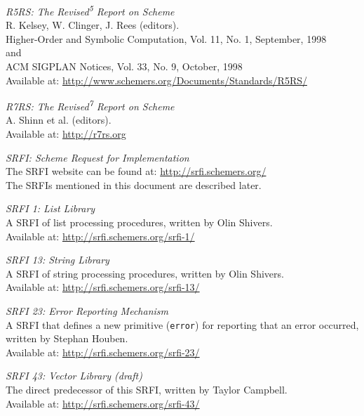 \begin{description}
\tightlist
\item[\href{}{R5RS}]
\emph{R5RS: The Revised\textsuperscript{5} Report on Scheme}\\
R. Kelsey, W. Clinger, J. Rees (editors).\\
Higher-Order and Symbolic Computation, Vol. 11, No. 1, September, 1998\\
and\\
ACM SIGPLAN Notices, Vol. 33, No. 9, October, 1998\\
Available at:
\url{http://www.schemers.org/Documents/Standards/R5RS/}\\[2\baselineskip]
\item[\href{}{R7RS-small}]
\emph{R7RS: The Revised\textsuperscript{7} Report on Scheme}\\
A. Shinn et al. (editors).\\
Available at: \url{http://r7rs.org}\\[2\baselineskip]
\item[\href{}{SRFI}]
\emph{SRFI: Scheme Request for Implementation}\\
The SRFI website can be found at: \url{http://srfi.schemers.org/}\\
The SRFIs mentioned in this document are described
later.\\[2\baselineskip]
\item[\href{}{SRFI 1}]
\emph{SRFI 1: List Library}\\
A SRFI of list processing procedures, written by Olin Shivers.\\
Available at: \url{http://srfi.schemers.org/srfi-1/}\\[2\baselineskip]
\item[\href{}{SRFI 13}]
\emph{SRFI 13: String Library}\\
A SRFI of string processing procedures, written by Olin Shivers.\\
Available at: \url{http://srfi.schemers.org/srfi-13/}\\[2\baselineskip]
\item[\href{}{SRFI 23}]
\emph{SRFI 23: Error Reporting Mechanism}\\
A SRFI that defines a new primitive (\texttt{error}) for reporting that
an error occurred, written by Stephan Houben.\\
Available at: \url{http://srfi.schemers.org/srfi-23/}\\[2\baselineskip]
\item[\href{}{SRFI 43}]
\emph{SRFI 43: Vector Library (draft)}\\
The direct predecessor of this SRFI, written by Taylor Campbell.\\
Available at: \url{http://srfi.schemers.org/srfi-43/}
\end{description}

